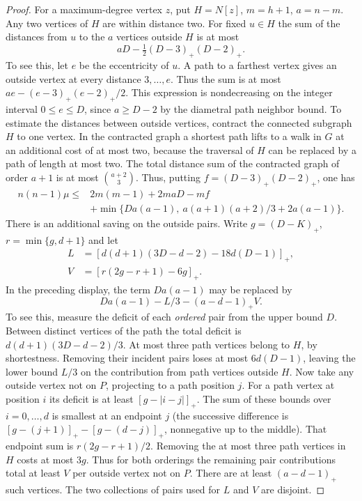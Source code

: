 \documentclass[11pt,a4paper]{article}
\begin{document}
\begin{proof}
For a maximum-degree vertex $z$, put $H=N[z]$, $m=h+1$, $a=n-m$.
Any two vertices of $H$ are within distance two. For fixed $u\in H$ the
sum of the distances from $u$ to the $a$ vertices outside $H$ is at most
\[
 aD-\tfrac12(D-3)_+(D-2)_+ .
\]
To see this, let $e$ be the eccentricity of $u$. A path to a farthest
vertex gives an outside vertex at every distance $3,\ldots,e$. Thus the
sum is at most $ae-(e-3)_+(e-2)_+/2$. This expression is nondecreasing on
the integer interval $0\le e\le D$, since $a\ge D-2$ by the diametral
path neighbor bound. To estimate the distances between outside vertices,
contract the connected subgraph $H$ to one vertex. In the contracted graph
a shortest path lifts to a walk in $G$ at an additional cost of at most
two, because the traversal of $H$ can be replaced by a path of length at
most two. The total distance sum of the contracted graph of order $a+1$
is at most $\binom{a+2}{3}$. Thus, putting $f=(D-3)_+(D-2)_+$, one has
\begin{align*}
 n(n-1)\mu\le {}&2m(m-1)+2maD-mf\\
 &+\min\{D a(a-1),\ a(a+1)(a+2)/3+2a(a-1)\}.
\end{align*}
There is an additional saving on the outside pairs. Write $g=(D-K)_+$,
$r=\min\{g,d+1\}$ and let
\begin{align*}
 L&=[d(d+1)(3D-d-2)-18d(D-1)]_+,\\
 V&=[r(2g-r+1)-6g]_+ .
\end{align*}
In the preceding display, the term $D a(a-1)$ may be replaced by
\[
 D a(a-1)-L/3-(a-d-1)_+ V .
\]
To see this, measure the deficit of each \emph{ordered} pair from the
upper bound $D$. Between distinct vertices of the path the total deficit
is $d(d+1)(3D-d-2)/3$. At most three path vertices belong to $H$, by
shortestness. Removing their incident pairs loses at most $6d(D-1)$,
leaving the lower bound $L/3$ on the contribution from path vertices
outside $H$. Now take any outside vertex not on $P$, projecting to a
path position $j$. For a path vertex at position $i$ its deficit is at
least $[g-|i-j|]_+$. The sum of these bounds over $i=0,\ldots,d$ is
smallest at an endpoint $j$ (the successive difference is
$[g-(j+1)]_+-[g-(d-j)]_+$, nonnegative up to the middle).
That endpoint sum is $r(2g-r+1)/2$. Removing the at most three path
vertices in $H$ costs at most $3g$. Thus for both orderings the
remaining pair contributions total at least $V$ per outside vertex
not on $P$. There are at least $(a-d-1)_+$ such vertices. The two
collections of pairs used for $L$ and $V$ are disjoint.


\end{proof}
\end{document}
